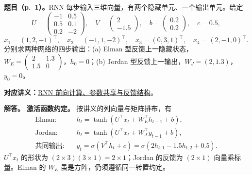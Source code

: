 
\begingroup
\renewcommand{\recordid}[1]{}
\renewcommand{\relatedtopic}[2]{\hyperref[topic:#1]{#2}}
\label{tutorial:SC4001-TUT08}

\nopagebreak[4]
\textbf{题目（p.~1）。}RNN 每步输入三维向量，有两个隐藏单元、一个输出单元。给定
\[
 U=\begin{pmatrix}-1&0.5\\0.5&0.1\\0.2&-2\end{pmatrix},\quad
 V=\begin{pmatrix}2\\-1.5\end{pmatrix},\quad
 b=\begin{pmatrix}0.2\\0.2\end{pmatrix},\quad c=0.5,
\]
\[
 x_1=(1,2,-1)^\top,\quad x_2=(-1,1,-2)^\top,\quad
 x_3=(0,3,1)^\top,\quad x_4=(2,-1,0)^\top.
\]
分别求两种网络的四步输出：(a) Elman 型反馈上一隐藏状态，$W_E=\begin{pmatrix}2&1.3\\1.5&0\end{pmatrix}$，$h_0=0$；(b) Jordan 型反馈上一输出，$W_J=(2,1.3)$，$y_0=0$。

\textbf{对应讲义：}\relatedtopic{SC4001-L08-T01}{RNN 前向计算、参数共享与反馈结构}。

\textbf{解答。}
\textbf{激活函数约定。}
按讲义的列向量与矩阵排布，有
\[
\begin{aligned}
 \text{Elman:}\quad &h_t=\tanh(U^\top x_t+W_E^\top h_{t-1}+b),\\
 \text{Jordan:}\quad &h_t=\tanh(U^\top x_t+W_J^\top y_{t-1}+b),\\
 \text{共同输出:}\quad &y_t=\sigma(V^\top h_t+c)
   =\sigma(2h_{t,1}-1.5h_{t,2}+0.5).
\end{aligned}
\]
$U^\top x_t$ 的形状为 $(2\times3)(3\times1)=2\times1$；Jordan 的反馈为 $(2\times1)$ 向量乘标量。Elman 的 $W_E$ 虽是方阵，仍须遵循同一转置约定。

